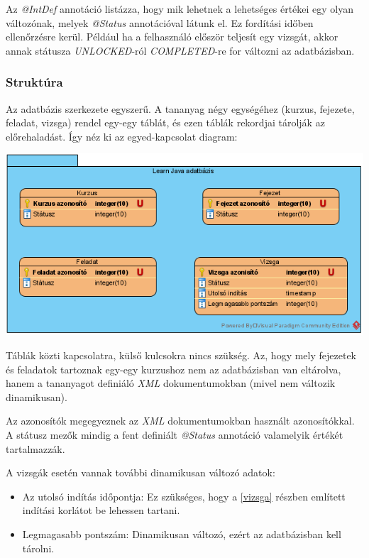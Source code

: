 \documentclass[12pt,a4paper]{article}
\newcommand{\xml}{\textit{XML}\xspace}
\begin{document}
	Az \textit{@IntDef} annotáció listázza, hogy mik lehetnek a lehetséges értékei egy olyan változónak, melyek \textit{@Status} annotációval látunk el. Ez fordítási időben ellenőrzésre kerül. Például ha a felhasználó először teljesít egy vizsgát, akkor annak státusza \textit{UNLOCKED}-ról \textit{COMPLETED}-re for változni az adatbázisban.
	 
	\subsubsection{Struktúra}\label{adatbazis_struktura}
	 
	Az adatbázis szerkezete egyszerű. A tananyag négy egységéhez (kurzus, fejezete, feladat, vizsga) rendel egy-egy táblát, és ezen táblák rekordjai tárolják az előrehaladást. Így néz ki az egyed-kapcsolat diagram:
	
	\begin{center}
		\includegraphics[width=\linewidth]{db_model}
	\end{center}
	
	Táblák közti kapcsolatra, külső kulcsokra nincs szükség. Az, hogy mely fejezetek és feladatok tartoznak egy-egy kurzushoz nem az adatbázisban van eltárolva, hanem a tananyagot definiáló \xml dokumentumokban (mivel nem változik dinamikusan).
	
	Az azonosítók megegyeznek az \xml dokumentumokban használt azonosítókkal. A státusz mezők mindig a fent definiált \textit{@Status} annotáció valamelyik értékét tartalmazzák.
	
	A vizsgák esetén vannak további dinamikusan változó adatok:
	
	\begin{itemize}
		\item Az utolsó indítás időpontja: Ez szükséges, hogy a \ref{vizsga} részben említett indítási korlátot be lehessen tartani.
		\item Legmagasabb pontszám: Dinamikusan változó, ezért az adatbázisban kell tárolni.
	\end{itemize}
	
\end{document}
